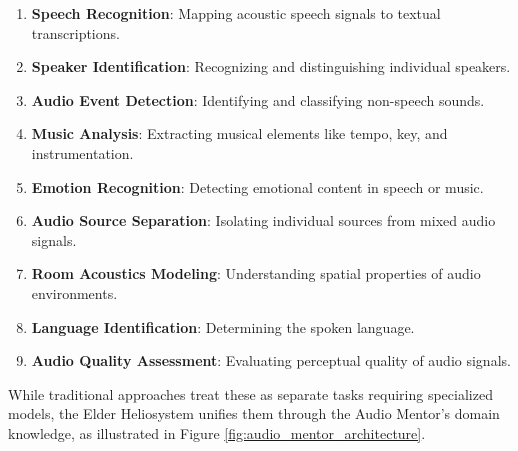 \begin{enumerate}
    \item \textbf{Speech Recognition}: Mapping acoustic speech signals to textual transcriptions.
    \item \textbf{Speaker Identification}: Recognizing and distinguishing individual speakers.
    \item \textbf{Audio Event Detection}: Identifying and classifying non-speech sounds.
    \item \textbf{Music Analysis}: Extracting musical elements like tempo, key, and instrumentation.
    \item \textbf{Emotion Recognition}: Detecting emotional content in speech or music.
    \item \textbf{Audio Source Separation}: Isolating individual sources from mixed audio signals.
    \item \textbf{Room Acoustics Modeling}: Understanding spatial properties of audio environments.
    \item \textbf{Language Identification}: Determining the spoken language.
    \item \textbf{Audio Quality Assessment}: Evaluating perceptual quality of audio signals.
\end{enumerate}

While traditional approaches treat these as separate tasks requiring specialized models, the Elder Heliosystem unifies them through the Audio Mentor's domain knowledge, as illustrated in Figure \ref{fig:audio_mentor_architecture}.

